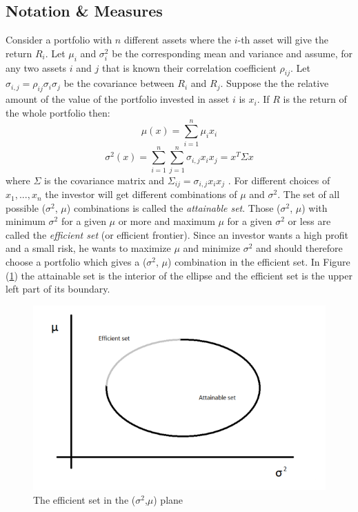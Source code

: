\subsection{Notation \& Measures}
Consider a portfolio with $n$ different assets where the $i$-th asset will give the return $R_i$. Let $\mu_i$ and $\sigma^2_i$ be the corresponding mean and variance and assume, for any two assets $i$ and $j$ that is known their correlation coefficient $\rho_{ij}$. Let $\sigma_{i,j} = \rho_{ij}\sigma_i\sigma_j$ be the covariance between $R_i$ and $R_j$. Suppose the the relative amount of the value of the portfolio invested in asset $i$ is $x_i$. If $R$ is the return of the whole portfolio then:
\begin{equation}
\mu(x) =  \sum\limits_{i=1}^n\mu_i x_i 
\end{equation}
\begin{equation}
\sigma^2(x) = \sum\limits_{i=1}^n\sum\limits_{j=1}^n\sigma_{i,j}x_i x_j = x^T \Sigma x
\end{equation}
where $\Sigma$ is the covariance matrix and $\Sigma_{ij} = \sigma_{i,j}x_i x_j$ \cite{markovitz}.
For different choices of $x_1, ..., x_n$ the investor will get different combinations of $\mu$ and $\sigma^2$. The set of all possible ($\sigma^2$, $\mu$) combinations is called the \textit{attainable set}. Those ($\sigma^2$, $\mu$) with minimum $\sigma^2$ for a given $\mu$ or more and maximum $\mu$ for a given $\sigma^2$ or less are called the \textit{efficient set} (or efficient frontier). Since an investor wants a high profit and a small risk, he wants to maximize $\mu$ and minimize $\sigma^2$ and should therefore choose a portfolio which gives a ($\sigma^2$, $\mu$) combination in the efficient set. In Figure (\ref{fig:efficient}) the attainable set is the interior of the ellipse and the efficient set is the upper left part of its boundary. \\
\begin{figure}
\centering
\includegraphics[scale=0.9]{efficient_set} 
\caption{The efficient set in the ($\sigma^2$,$\mu$) plane}
\label{fig:efficient}
\end{figure}

